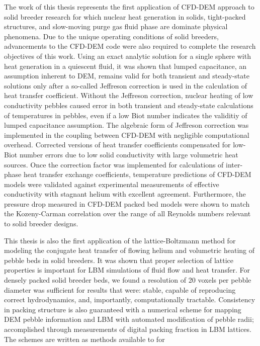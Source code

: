 The work of this thesis represents the first application of CFD-DEM approach to solid breeder research for which nuclear heat generation in solids, tight-packed structures, and slow-moving purge gas fluid phase are dominate physical phenomena. Due to the unique operating conditions of solid breeders, advancements to the CFD-DEM code were also required to complete the research objectives of this work. Using an exact analytic solution for a single sphere with heat generation in a quiescent fluid, it was shown that lumped capacitance, an assumption inherent to DEM, remains valid for both transient and steady-state solutions only after a so-called Jeffreson correction is used in the calculation of heat transfer coefficient. Without the Jeffreson correction, nuclear heating of low conductivity pebbles caused error in both transient and steady-state calculations of temperatures in pebbles, even if a low Biot number indicates the validitiy of lumped capacitance assumption. The algebraic form of Jeffreson correction was implemented in the coupling between CFD-DEM with negligible computational overhead. Corrected versions of heat transfer coefficients compensated for low-Biot number errors due to low solid conductivity with large volumetric heat sources. Once the correction factor was implemented for calculations of inter-phase heat transfer exchange coefficients, temperature predictions of CFD-DEM models were validated against experimental measurements of effective conductivity with stagnant helium with excellent agreement. Furthermore, the pressure drop measured in CFD-DEM packed bed models were shown to match the Kozeny-Carman correlation over the range of all Reynolds numbers relevant to solid breeder designs.

This thesis is also the first application of the lattice-Boltzmann method for modeling the conjugate heat transfer of flowing helium and volumetric heating of pebble beds in solid breeders. It was shown that proper selection of lattice properties is important for LBM simulations of fluid flow and heat transfer. For densely packed solid breeder beds, we found a resolution of 20 voxels per pebble diameter was sufficient for results that were: stable, capable of reproducing correct hydrodynamics, and, importantly, computationally tractable. Consistency in packing structure is also guaranteed with a numerical scheme for mapping DEM pebble information and LBM with automated  modification of pebble radii; accomplished through measurements of digital packing fraction in LBM lattices. The schemes are written as methods available to for 


